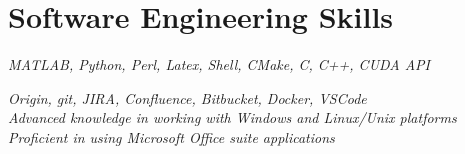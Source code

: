 \documentclass[10pt]{article} %
\begin{document}
\section{Software Engineering Skills}



{
\textit{MATLAB, Python, Perl, Latex, Shell, CMake, C, C++, CUDA API}

}

{
\textit{Origin, git, JIRA, Confluence, Bitbucket, Docker, VSCode}\\
\textit{Advanced knowledge in working with Windows and Linux/Unix platforms}\\
\textit{Proficient in using Microsoft Office suite applications }
}
\end{document}
